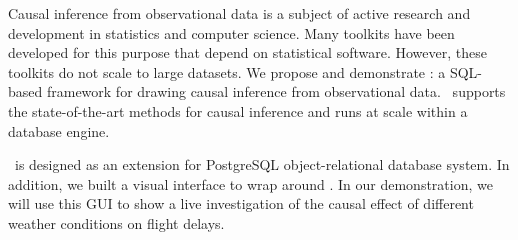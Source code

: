 Causal inference from observational data is a subject of active research and development in statistics and computer science. Many toolkits have been developed for this purpose that depend on statistical software.
However, these toolkits do not scale to large datasets.
We propose and demonstrate \GSQL: a SQL-based framework for drawing causal inference from observational data.
\GSQL\ supports the state-of-the-art methods for causal inference and runs at scale within a database engine.
\GSQL\ is designed as an extension for PostgreSQL object-relational database system.
In addition, we built a visual interface to wrap around \GSQL. In our demonstration, we will use this GUI to show a live investigation of the causal effect of different weather conditions on flight delays. 